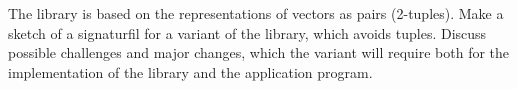 The library  is based on the representations of vectors as pairs (2-tuples). Make a sketch of a signaturfil for a variant of the library, which avoids tuples. Discuss possible challenges and major changes, which the variant will require both for the implementation of the library and the application program.
